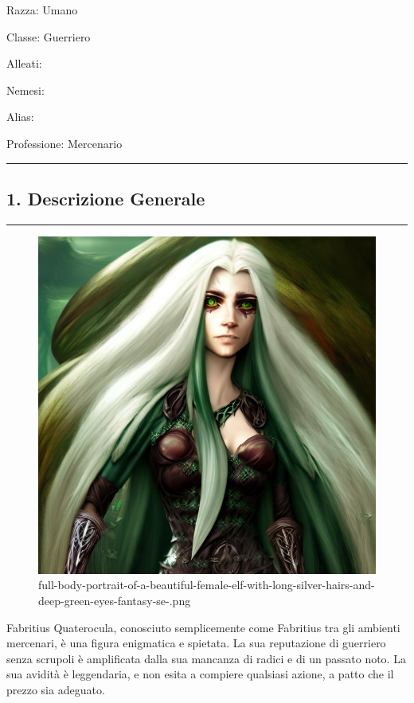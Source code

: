 Razza: Umano

Classe: Guerriero

Alleati:

Nemesi:

Alias:

Professione: Mercenario

\begin{center}\rule{0.5\linewidth}{0.5pt}\end{center}

\subsection{1. Descrizione Generale}\label{descrizione-generale}

\begin{center}\rule{0.5\linewidth}{0.5pt}\end{center}

\begin{figure}
\centering
\includegraphics{full-body-portrait-of-a-beautiful-female-elf-with-long-silver-hairs-and-deep-green-eyes-fantasy-se-.png}
\caption{full-body-portrait-of-a-beautiful-female-elf-with-long-silver-hairs-and-deep-green-eyes-fantasy-se-.png}
\end{figure}

Fabritius Quaterocula, conosciuto semplicemente come Fabritius tra gli
ambienti mercenari, è una figura enigmatica e spietata. La sua
reputazione di guerriero senza scrupoli è amplificata dalla sua mancanza
di radici e di un passato noto. La sua avidità è leggendaria, e non
esita a compiere qualsiasi azione, a patto che il prezzo sia adeguato.

